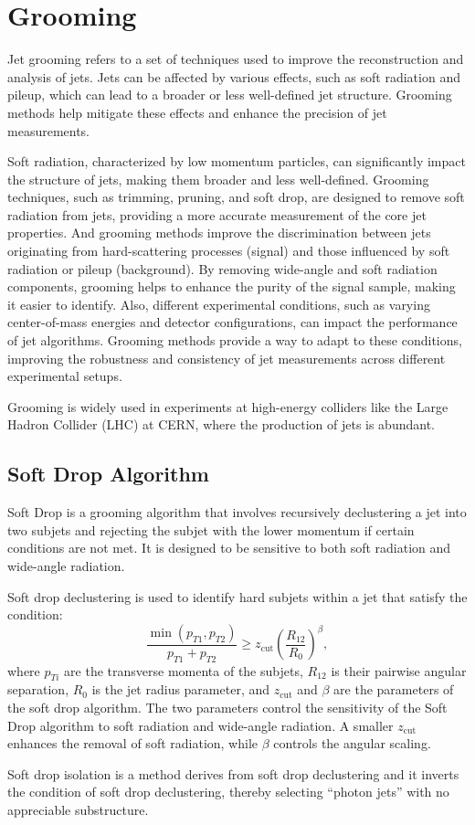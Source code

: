 \documentclass[a4paper, 12pt]{article}
\begin{document}
\section{Grooming}
	Jet grooming refers to a set of techniques used to improve the reconstruction and analysis of jets. Jets can be affected by various
	effects, such as soft radiation and pileup, which can lead to a broader or less well-defined jet structure. Grooming methods help
	mitigate these effects and enhance the precision of jet measurements.\par
	Soft radiation, characterized by low momentum particles, can significantly impact the structure of jets, making them broader and
	less well-defined. Grooming techniques, such as trimming, pruning, and soft drop, are designed to remove soft radiation from jets,
	providing a more accurate measurement of the core jet properties. And grooming methods improve the discrimination between jets
	originating from hard-scattering processes (signal) and those influenced by soft radiation or pileup (background). By removing
	wide-angle and soft radiation components, grooming helps to enhance the purity of the signal sample, making it easier to identify.
	Also, different experimental conditions, such as varying center-of-mass energies and detector configurations, can impact the
	performance of jet algorithms. Grooming methods provide a way to adapt to these conditions, improving the robustness and consistency
	of jet measurements across different experimental setups.\par
	Grooming is widely used in experiments at high-energy colliders like the Large Hadron Collider (LHC) at CERN, where the production
	of jets is abundant.\par
	\subsection{Soft Drop Algorithm}
		Soft Drop is a grooming algorithm that involves recursively declustering a jet into two subjets and rejecting the subjet with the
		lower momentum if certain conditions are not met. It is designed to be sensitive to both soft radiation and wide-angle radiation.\par
		Soft drop declustering is used to identify hard subjets within a jet that satisfy the condition:
		\begin{equation}
			\frac{\min(p_{T1},p_{T2})}{p_{T1}+p_{T2}}\geq z_{\mathrm{cut}}\left(\frac{R_{12}}{R_0}\right)^{\beta},
		\end{equation}
		where $p_{Ti}$ are the transverse momenta of the subjets, $R_{12}$ is their pairwise angular separation, $R_0$ is the jet radius
		parameter, and $z_{\mathrm{cut}}$ and $\beta$ are the parameters of the soft drop algorithm. The two parameters control the sensitivity of
		the Soft Drop algorithm to soft radiation and wide-angle radiation. A smaller $z_{\mathrm{cut}}$ enhances the removal of soft radiation, while
		$\beta$ controls the angular scaling.\par
		Soft drop isolation is a method derives from soft drop declustering and it inverts the condition of soft drop declustering,
		thereby selecting “photon jets” with no appreciable substructure.
\end{document}
